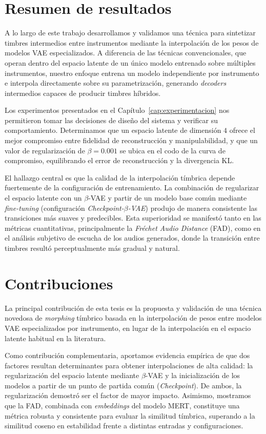 \documentclass[12pt,a4paper,twoside]{tesis}
\begin{document}
\section{Resumen de resultados}

A lo largo de este trabajo desarrollamos y validamos una técnica para sintetizar timbres intermedios entre instrumentos mediante la interpolación de los pesos de modelos VAE especializados. A diferencia de las técnicas convencionales, que operan dentro del espacio latente de un único modelo entrenado sobre múltiples instrumentos, nuestro enfoque entrena un modelo independiente por instrumento e interpola directamente sobre su parametrización, generando \textit{decoders} intermedios capaces de producir timbres híbridos.

Los experimentos presentados en el Capítulo~\ref{cap:experimentacion} nos permitieron tomar las decisiones de diseño del sistema y verificar su comportamiento. Determinamos que un espacio latente de dimensión $4$ ofrece el mejor compromiso entre fidelidad de reconstrucción y manipulabilidad, y que un valor de regularización de $\beta=0.001$ se ubica en el codo de la curva de compromiso, equilibrando el error de reconstrucción y la divergencia KL.

El hallazgo central es que la calidad de la interpolación tímbrica depende fuertemente de la configuración de entrenamiento. La combinación de regularizar el espacio latente con un $\beta$-VAE y partir de un modelo base común mediante \textit{fine-tuning} (configuración \textit{Checkpoint-$\beta$-VAE}) produjo de manera consistente las transiciones más suaves y predecibles. Esta superioridad se manifestó tanto en las métricas cuantitativas, principalmente la \textit{Fréchet Audio Distance} (FAD), como en el análisis subjetivo de escucha de los audios generados, donde la transición entre timbres resultó perceptualmente más gradual y natural.

\section{Contribuciones}

La principal contribución de esta tesis es la propuesta y validación de una técnica novedosa de \emph{morphing} tímbrico basada en la interpolación de pesos entre modelos VAE especializados por instrumento, en lugar de la interpolación en el espacio latente habitual en la literatura.

Como contribución complementaria, aportamos evidencia empírica de que dos factores resultan determinantes para obtener interpolaciones de alta calidad: la regularización del espacio latente mediante $\beta$-VAE y la inicialización de los modelos a partir de un punto de partida común (\textit{Checkpoint}). De ambos, la regularización demostró ser el factor de mayor impacto. Asimismo, mostramos que la FAD, combinada con \textit{embeddings} del modelo MERT, constituye una métrica robusta y consistente para evaluar la similitud tímbrica, superando a la similitud coseno en estabilidad frente a distintas entradas y configuraciones.
\end{document}

